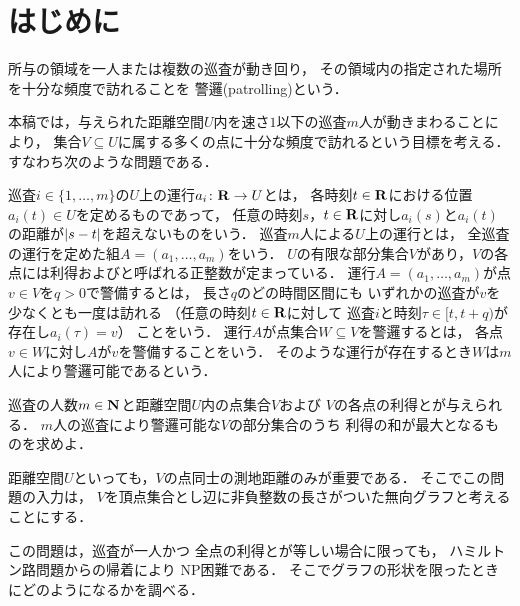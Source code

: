 \section{はじめに}
\label{section: introduction}
所与の領域を一人または複数の巡査が動き回り，
その領域内の指定された場所を十分な頻度で訪れることを
警邏(patrolling)という\cite{chen2013fence, coene2011charlemagne, czyzowicz2011boundary}．

本稿では，与えられた距離空間$U$内を速さ$1$以下の巡査$m$人が動きまわることにより，
集合$V \subseteq U$に属する多くの点に十分な頻度で訪れるという目標を考える．
すなわち次のような問題である．

巡査$i \in \{1, \ldots, m\}$の$U$上の運行$a _i \colon \mathbf R \to U$とは，
各時刻$t \in \mathbf R$における位置$a _i (t) \in U$を定めるものであって，
任意の時刻$s$，$t \in \mathbf R$に対し$a _i (s)$と$a _i (t)$の距離が$\lvert{s - t}\rvert$を超えないものをいう．
巡査$m$人による$U$上の運行とは，
全巡査の運行を定めた組$A = (a _1, \dots, a _m)$をいう．
$U$の有限な部分集合$V$があり，$V$の各点には利得および{\maxIdletime}と呼ばれる正整数が定まっている．
運行$A = (a _1, \dots, a _m)$が点$v \in V$を{\maxIdletime}$q > 0$で警備するとは，
長さ$q$のどの時間区間にも
いずれかの巡査が$v$を少なくとも一度は訪れる
（任意の時刻$t \in \mathbf R$に対して
巡査$i$と時刻$\tau \in [t, t + q)$が存在し$a _i (\tau) = v$）
ことをいう．
運行$A$が点集合$W \subseteq V$を警邏するとは，
各点$v \in W$に対し$A$が$v$を警備することをいう．
そのような運行が存在するとき$W$は$m$人により警邏可能であるという．

\begin{patrollingProblem}
巡査の人数$m \in \mathbf N$と距離空間$U$内の点集合$V$および
$V$の各点の利得と{\maxIdletime}が与えられる．
$m$人の巡査により警邏可能な$V$の部分集合のうち
利得の和が最大となるものを求めよ．
\end{patrollingProblem}

距離空間$U$といっても，$V$の点同士の測地距離のみが重要である．
そこでこの問題の入力は，
$V$を頂点集合とし辺に非負整数の長さがついた無向グラフと考えることにする．

この問題は，巡査が一人かつ
全点の利得と{\maxIdletime}が等しい場合に限っても，
ハミルトン路問題からの帰着により
NP困難である\cite[Theorem~8]{coene2011charlemagne}．
そこでグラフの形状を限ったときにどのようになるかを調べる．

